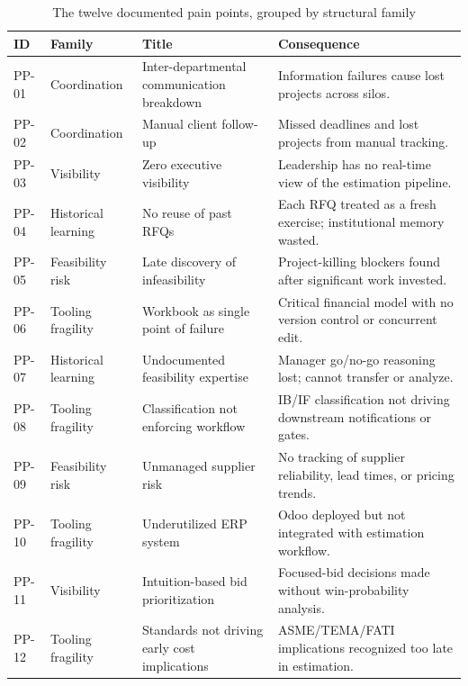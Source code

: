 \begin{table}[H]
\centering
\renewcommand{\arraystretch}{1.3}
\begin{tabular}{|p{1.2cm}|p{2.6cm}|p{3.3cm}|p{6.5cm}|}
\hline
\rowcolor{lightgray}
\textbf{ID} & \textbf{Family} & \textbf{Title} & \textbf{Consequence} \\ \hline
PP-01 & Coordination & Inter-departmental communication breakdown & Information failures cause lost projects across silos. \\ \hline
PP-02 & Coordination & Manual client follow-up & Missed deadlines and lost projects from manual tracking. \\ \hline
PP-03 & Visibility & Zero executive visibility & Leadership has no real-time view of the estimation pipeline. \\ \hline
PP-04 & Historical learning & No reuse of past RFQs & Each RFQ treated as a fresh exercise; institutional memory wasted. \\ \hline
PP-05 & Feasibility risk & Late discovery of infeasibility & Project-killing blockers found after significant work invested. \\ \hline
PP-06 & Tooling fragility & Workbook as single point of failure & Critical financial model with no version control or concurrent edit. \\ \hline
PP-07 & Historical learning & Undocumented feasibility expertise & Manager go/no-go reasoning lost; cannot transfer or analyze. \\ \hline
PP-08 & Tooling fragility & Classification not enforcing workflow & IB/IF classification not driving downstream notifications or gates. \\ \hline
PP-09 & Feasibility risk & Unmanaged supplier risk & No tracking of supplier reliability, lead times, or pricing trends. \\ \hline
PP-10 & Tooling fragility & Underutilized ERP system & Odoo deployed but not integrated with estimation workflow. \\ \hline
PP-11 & Visibility & Intuition-based bid prioritization & Focused-bid decisions made without win-probability analysis. \\ \hline
PP-12 & Tooling fragility & Standards not driving early cost implications & ASME/TEMA/FATI implications recognized too late in estimation. \\ \hline
\end{tabular}
\caption{The twelve documented pain points, grouped by structural family}
\label{tab:pain_points}
\end{table}

